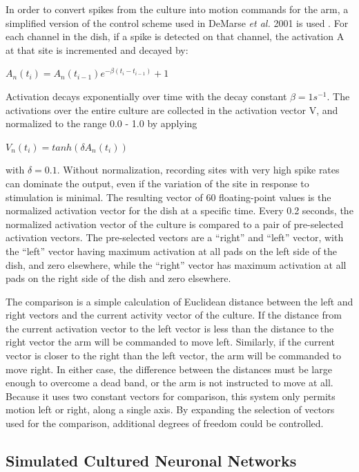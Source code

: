 \documentclass[letterpaper]{article}
\begin{document}
In order to convert spikes from the culture into motion commands for the arm, a simplified version of the control scheme used in DeMarse \textit{et al.} 2001 is used . 
For each channel in the dish, if a spike is detected on that channel, the activation A at that site is incremented and decayed by: 

$A_n (t_i) = A_n(t_{i-1})e^{-\beta(t_i - t_{i-1})} + 1$

Activation decays exponentially over time with the decay constant $\beta=1s^{-1}$.
The activations over the entire culture are collected in the activation vector V, and normalized to the range 0.0 - 1.0 by applying

$V_n(t_i) = tanh(\delta A_n(t_i))$

\noindent with $\delta=0.1$. Without normalization, recording sites with very high spike rates can dominate the output, even if the variation of the site in response to stimulation is minimal. 
The resulting vector of 60 floating-point values is the normalized activation vector for the dish at a specific time.
Every 0.2 seconds, the normalized activation vector of the culture is compared to a pair of pre-selected activation vectors. 
The pre-selected vectors are a ``right'' and ``left'' vector, with the ``left'' vector having maximum activation at all pads on the left side of the dish, and zero elsewhere, while the ``right'' vector has maximum activation at all pads on the right side of the dish and zero elsewhere. 

The comparison is a simple calculation of Euclidean distance between the left and right vectors and the current activity vector of the culture. 
If the distance from the current activation vector to the left vector is less than the distance to the right vector the arm will be commanded to move left. 
Similarly, if the current vector is closer to the right than the left vector, the arm will be commanded to move right. 
In either case, the difference between the distances must be large enough to overcome a dead band, or the arm is not instructed to move at all. 
Because it uses two constant vectors for comparison, this system only permits motion left or right, along a single axis. 
By expanding the selection of vectors used for the comparison, additional degrees of freedom could be controlled. 

\subsection{Simulated Cultured Neuronal Networks}
\end{document}
